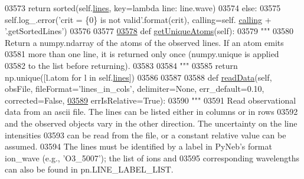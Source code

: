 \begin{DoxyCode}
{{{{{{{{{{{{{{{{{{{{{{03573             \textcolor{keywordflow}{return} sorted(self.\hyperlink{classpyneb_1_1core_1_1pynebcore_1_1_observation_a78332043ca9f290590edf6b8a1e5b767}{lines}, key=\textcolor{keyword}{lambda} line: line.wave)
03574         \textcolor{keywordflow}{else}:
03575             self.log\_.error(\textcolor{stringliteral}{'crit = \{0\} is not valid'}.format(crit), calling=self.
      \hyperlink{classpyneb_1_1core_1_1pynebcore_1_1_observation_a2639fad9af4fefad20e4097295bd40e7}{calling} + \textcolor{stringliteral}{'.getSortedLines'})
03576 
03577     
\hypertarget{pynebcore_8py_source_l03578}{}\hyperlink{classpyneb_1_1core_1_1pynebcore_1_1_observation_abe65e91f7abc06d2c525d6c1a3d05627}{03578}     \textcolor{keyword}{def }\hyperlink{classpyneb_1_1core_1_1pynebcore_1_1_observation_abe65e91f7abc06d2c525d6c1a3d05627}{getUniqueAtoms}(self):
03579         \textcolor{stringliteral}{"""}
03580 \textcolor{stringliteral}{        Return a numpy.ndarray of the atoms of the observed lines. If an atom emits }
03581 \textcolor{stringliteral}{        more than one line, it is returned only once (numpy.unique is applied }
03582 \textcolor{stringliteral}{        to the list before returning).}
03583 \textcolor{stringliteral}{}
03584 \textcolor{stringliteral}{        """}
03585         \textcolor{keywordflow}{return} np.unique([l.atom \textcolor{keywordflow}{for} l \textcolor{keywordflow}{in} self.\hyperlink{classpyneb_1_1core_1_1pynebcore_1_1_observation_a78332043ca9f290590edf6b8a1e5b767}{lines}])
03586 
03587     
03588     \textcolor{keyword}{def }\hyperlink{classpyneb_1_1core_1_1pynebcore_1_1_observation_aa33f35ce2f56f5b8a5666601b24a1107}{readData}(self, obsFile, fileFormat='lines\_in\_cols', delimiter=None, err\_default=0.10, 
      corrected=False,
\hypertarget{pynebcore_8py_source_l03589}{}\hyperlink{classpyneb_1_1core_1_1pynebcore_1_1_observation_aa33f35ce2f56f5b8a5666601b24a1107}{03589}                  errIsRelative=\textcolor{keyword}{True}):
03590         \textcolor{stringliteral}{"""}
03591 \textcolor{stringliteral}{        Read observational data from an ascii file. The lines can be listed either in columns or in rows}
03592 \textcolor{stringliteral}{        and the observed objects vary in the other direction. The uncertainty on the line intensities}
03593 \textcolor{stringliteral}{        can be read from the file, or a constant relative value can be assumed.}
03594 \textcolor{stringliteral}{        The lines must be identified by a label in PyNeb's format ion\_wave (e.g., 'O3\_5007'); the list of
       ions and}
03595 \textcolor{stringliteral}{        corresponding wavelengths can also be found in pn.LINE\_LABEL\_LIST.}
}}}}}}}}}}}}}}}}}}}}}}
\end{DoxyCode}

